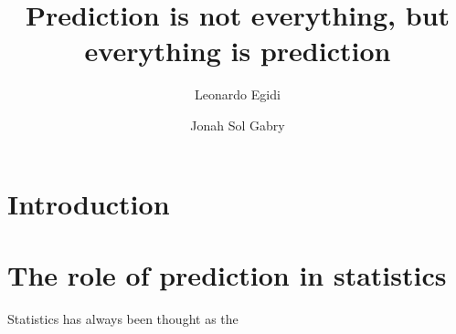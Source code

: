 \documentclass{statsoc}
\title[]{Prediction is not everything, but everything is prediction}
\author[Egidi and Gabry]{Leonardo Egidi}
\author[Egidi and Gabry]{Jonah Sol Gabry}
\begin{document}
\maketitle

\begin{abstract}


\end{abstract}

\section{Introduction}

\section{The role of prediction in statistics}

Statistics has always been thought as the 







\end{document}

